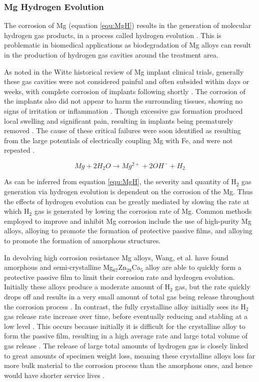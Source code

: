 \documentclass[a4paper,12pt,oneside]{report}%
\begin{document}
\subsubsection{Mg Hydrogen Evolution}
The corrosion of Mg (equation \ref{equ:MgH}) results in the generation of molecular hydrogen gas products, in a process called hydrogen evolution \cite{Zberg2009}. This is problematic in biomedical applications as biodegradation of Mg alloys can result in the production of hydrogen gas cavities around the treatment area. 

As noted in the Witte \cite{Witte2010} historical review of Mg implant clinical trials, generally these gas cavities were not considered painful and often subsided within days or weeks, with complete corrosion of implants following shortly \cite{Verbrugge1933, Lambotte1932}. The corrosion of the implants also did not appear to harm the surrounding tissues, showing no signs of irritation or inflammation \cite{Verbrugge1933}. Though excessive gas formation produced local swelling and significant pain, resulting in implants being prematurely removed \cite{Lambotte1932}. The cause of these critical failures were soon identified as resulting from the large potentials of electrically coupling Mg with Fe, and were not repeated \cite{Lambotte1932}. 

\begin{equation}
Mg + 2H_{2}O \rightarrow Mg^{2+} + 2OH^{-} + H_{2}
\label{equ:MgH}
\end{equation}

As can be inferred from equation \ref{equ:MgH}, the severity and quantity of H$_{2}$ gas generation via hydrogen evolution is dependent on the corrosion of the Mg. Thus the effects of hydrogen evolution can be greatly mediated by slowing the rate at which H$_{2}$ gas is generated by lowing the corrosion rate of Mg. Common methods employed to improve and inhibit Mg corrosion include the use of high-purity Mg alloys, alloying to promote the formation of protective passive films, and alloying to promote the formation of amorphous structures. 

In devolving high corrosion resistance Mg alloys, Wang, et al. \cite{Wang2012} have found amorphous and semi-crystalline Mg$_{67}$Zn$_{28}$Ca$_{5}$  alloy are able to quickly form a protective passive film to limit their corrosion rate and hydrogen evolution. Initially these alloys produce a moderate amount of H$_{2}$ gas, but the rate quickly drops off and results in a very small amount of total gas being release throughout the corrosion process \cite{Wang2012}. In contrast, the fully crystalline alloy initially sees its H$_{2}$ gas release rate increase over time, before eventually reducing and stabling at a low level \cite{Wang2012}. This occurs because initially it is difficult for the crystalline alloy to form the passive film, resulting in a high average rate and large total volume of gas release \cite{Wang2012}. The release of large total amounts of hydrogen gas is closely linked to great amounts of specimen weight loss, meaning these crystalline alloys loss far more bulk material to the corrosion process than the amorphous ones, and hence would have shorter service lives \cite{Wang2012}. 
\end{document}
